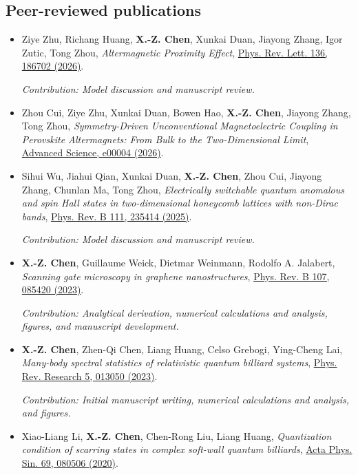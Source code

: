\documentclass[letterpaper,11pt]{article}
\begin{document}
\subsection*{Peer-reviewed publications}
\begin{itemize}[leftmargin=1.8em,label={},itemsep=0.55em,topsep=0.3em]
\item[\textbf{[9]}] Ziye Zhu, Richang Huang, \textbf{X.-Z. Chen}, Xunkai Duan, Jiayong Zhang, Igor Zutic, Tong Zhou, \textit{Altermagnetic Proximity Effect}, \href{https://doi.org/10.1103/kqy8-myz1}{Phys. Rev. Lett. 136, 186702 (2026)}.
\par {\footnotesize\textit{Contribution: Model discussion and manuscript review.}}
\item[\textbf{[8]}] Zhou Cui, Ziye Zhu, Xunkai Duan, Bowen Hao, \textbf{X.-Z. Chen}, Jiayong Zhang, Tong Zhou, \textit{Symmetry-Driven Unconventional Magnetoelectric Coupling in Perovskite Altermagnets: From Bulk to the Two-Dimensional Limit}, \href{https://doi.org/10.1002/advs.202600004}{Advanced Science, e00004 (2026)}.
\item[\textbf{[7]}] Sihui Wu, Jiahui Qian, Xunkai Duan, \textbf{X.-Z. Chen}, Zhou Cui, Jiayong Zhang, Chunlan Ma, Tong Zhou, \textit{Electrically switchable quantum anomalous and spin Hall states in two-dimensional honeycomb lattices with non-Dirac bands}, \href{https://doi.org/10.1103/PhysRevB.111.235414}{Phys. Rev. B 111, 235414 (2025)}.
\par {\footnotesize\textit{Contribution: Model discussion and manuscript review.}}
\item[\textbf{[6]}] \textbf{X.-Z. Chen}, Guillaume Weick, Dietmar Weinmann, Rodolfo A. Jalabert, \textit{Scanning gate microscopy in graphene nanostructures}, \href{https://doi.org/10.1103/PhysRevB.107.085420}{Phys. Rev. B 107, 085420 (2023)}.
\par {\footnotesize\textit{Contribution: Analytical derivation, numerical calculations and analysis, figures, and manuscript development.}}
\item[\textbf{[5]}] \textbf{X.-Z. Chen}, Zhen-Qi Chen, Liang Huang, Celso Grebogi, Ying-Cheng Lai, \textit{Many-body spectral statistics of relativistic quantum billiard systems}, \href{https://doi.org/10.1103/PhysRevResearch.5.013050}{Phys. Rev. Research 5, 013050 (2023)}.
\par {\footnotesize\textit{Contribution: Initial manuscript writing, numerical calculations and analysis, and figures.}}
\item[\textbf{[4]}] Xiao-Liang Li, \textbf{X.-Z. Chen}, Chen-Rong Liu, Liang Huang, \textit{Quantization condition of scarring states in complex soft-wall quantum billiards}, \href{https://doi.org/10.7498/aps.69.20200360}{Acta Phys. Sin. 69, 080506 (2020)}.

\end{itemize}
\end{document}
